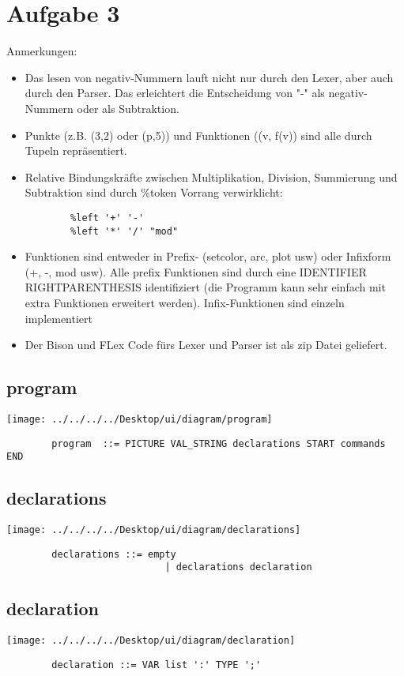 \documentclass[11pt]{scrartcl}
\begin{document}
	\section*{Aufgabe 3}
	Anmerkungen: 
	\begin{itemize}
		\item Das lesen von negativ-Nummern lauft nicht nur durch den Lexer, aber auch durch den Parser. Das erleichtert die Entscheidung von "-" als negativ-Nummern oder als Subtraktion.
		\item Punkte (z.B. (3,2) oder (p,5)) und Funktionen ((v, f(v)) sind alle durch Tupeln repr\"{a}sentiert.
		\item Relative Bindungskräfte zwischen Multiplikation, Division, Summierung und Subtraktion sind durch \%token Vorrang verwirklicht:
		\begin{verbatim}
		%left '+' '-'
		%left '*' '/' "mod"
		\end{verbatim}
		\item Funktionen sind entweder in Prefix- (setcolor, arc, plot usw) oder Infixform (+, -, mod usw). Alle prefix Funktionen sind durch eine IDENTIFIER RIGHTPARENTHESIS identifiziert (die Programm kann sehr einfach mit extra Funktionen erweitert werden). Infix-Funktionen sind einzeln implementiert
		\item Der Bison und FLex Code fürs Lexer und Parser ist als zip Datei geliefert.
	\end{itemize}\begin{flushleft}
	\subsection*{program}
		\texttt{[image: ../../../../Desktop/ui/diagram/program]}
		\begin{verbatim}
		program  ::= PICTURE VAL_STRING declarations START commands END
		\end{verbatim}
	\subsection*{declarations}
		\texttt{[image: ../../../../Desktop/ui/diagram/declarations]}
		\begin{verbatim}
		declarations ::= empty
							| declarations declaration
		\end{verbatim}
	\subsection*{declaration}
		\texttt{[image: ../../../../Desktop/ui/diagram/declaration]}
		\begin{verbatim}
		declaration ::= VAR list ':' TYPE ';'
		\end{verbatim}

\end{flushleft}
\end{document}
